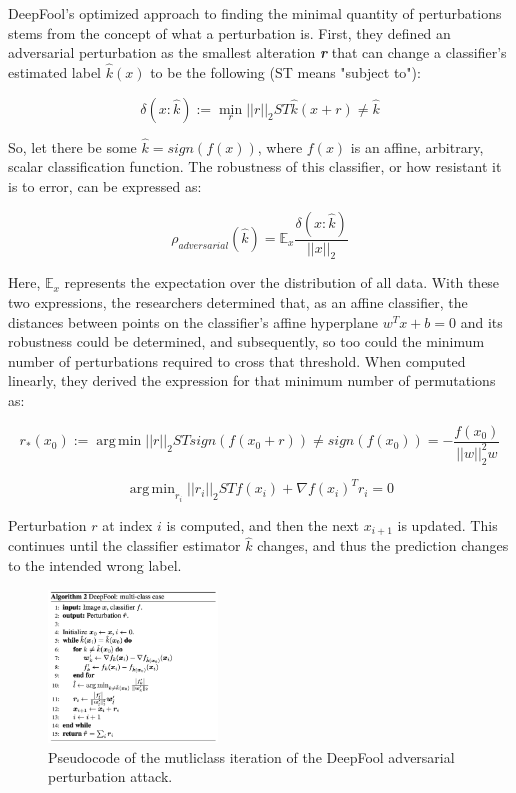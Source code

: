 \documentclass[../article.tex]{subfiles}
\DeclareMathOperator*{\argmin}{arg\,min}
\begin{document}
DeepFool's optimized approach to finding the minimal quantity of perturbations stems from the concept of what a perturbation is. First, they defined an adversarial perturbation as the smallest alteration \textit{\textbf{r}} that can change a classifier's estimated label $\hat{k}(x)$ to be the following (ST means "subject to"):

\[\delta(x:\hat{k}) := \min_r||r||_2  ST \hat{k}(x + r) \neq \hat{k}\]

So, let there be some $\hat{k} = sign(f(x))$, where $f(x)$ is an affine, arbitrary, scalar classification function. The robustness of this classifier, or how resistant it is to error, can be expressed as:

\[ \rho_{adversarial} (\hat{k}) = \mathbb{E}_x \frac{\delta(x:\hat{k})}{||x||_2}\]

Here, $\mathbb{E}_x$ represents the expectation over the distribution of all data. With these two expressions, the researchers determined that, as an affine classifier, the distances between points on the classifier's affine hyperplane $w^T x + b = 0$ and its robustness could be determined, and subsequently, so too could the minimum number of perturbations required to cross that threshold. When computed linearly, they derived the expression for that minimum number of permutations as:

\[r_*(x_0) := \argmin ||r||_2 ST sign(f(x_0+r)) \neq sign(f(x_0)) = -\frac{f(x_0)}{||w||_2^2 w}\]

\[\argmin_{r_i} || r_i ||_2 ST f(x_i) + \nabla f(x_i)^T r_i = 0\]

Perturbation $r$ at index $i$ is computed, and then the next $x_{i+1}$ is updated. This continues until the classifier estimator $\hat{k}$ changes, and thus the prediction changes to the intended wrong label.

\begin{figure} %
	\centering
	\includegraphics[width=0.4\textwidth]{deepfool_multi_class.png}
	\caption{\label{fig:Figure 2}Pseudocode of the mutliclass iteration of the DeepFool adversarial perturbation attack.}
\end{figure}
\end{document}
